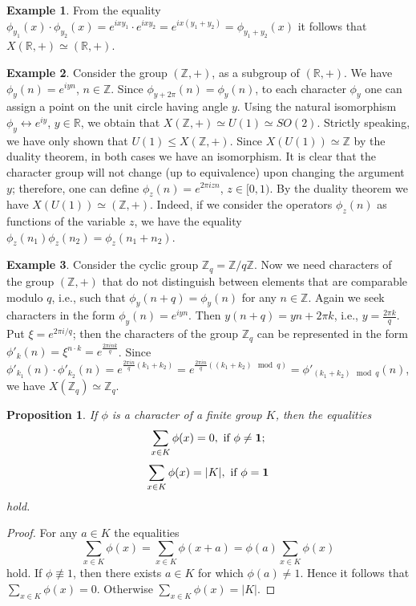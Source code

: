 \documentclass[11pt]{article}
\newtheorem{claim}{Proposition}[section]
\theoremstyle{definition}
\newtheorem{example}{Example}[section]
\begin{document}
{{{\begin{example}
From the equality $\phi_{y_1}(x)\cdot\phi_{y_2}(x)=e^{ixy_1}\cdot
e^{ixy_2}=e^{ix(y_1+y_2)}=\phi_{y_1+y_2}(x)$ it follows that
$X(\mathbb{R},+) \simeq (\mathbb{R},+)$.\end{example}

\begin{example}\label{ex:charZ}
 Consider the group $(\mathbb{Z},+)$, as a subgroup of
$(\mathbb{R},+)$. We have $\phi_y (n)=e^{iyn}$, $n\in \mathbb{Z}$.
Since $\phi_{y+2\pi} (n)=\phi_y (n)$, to each character $\phi_y$
one can assign a point on the unit circle
having angle $y$. Using the natural isomorphism
$\phi_y\leftrightarrow e^{iy}$, $y\in \mathbb{R}$,
we obtain that
$X({\mathbb{Z},+})\simeq U(1)\simeq SO(2)$. 
Strictly speaking, we have only shown that $U(1)\leq
X({\mathbb{Z},+})$. Since $X(U(1))\simeq  \mathbb{Z}$ by
 the duality theorem, in both cases we have an isomorphism.
It is clear that the
character group will not change (up to equivalence) upon changing
the argument $y$; therefore, one can define $\phi_z (n)=e^{2\pi izn}$,
$z\in [0,1)$. By the duality theorem we have
$X(U(1))\simeq(\mathbb{Z},+)$. Indeed, if we consider
the operators $\phi_z (n)$ as functions of the variable $z$, we have
the equality $\phi_z (n_1)\phi_z (n_2)=\phi_z(n_1+n_2)$.\end{example}

\begin{example}\label{ex:charZ_q}
 Consider the cyclic group
$\mathbb{Z}_q=\mathbb{Z}/q\mathbb{Z}$. Now we need
characters of the group $(\mathbb{Z},+)$ that do not distinguish between elements that are comparable
modulo $q$, i.e., such that $\phi_y (n+q)=\phi_y(n)$ for any
$n\in \mathbb{Z}$. Again we seek characters in the form $\phi_y (n)=e^{iyn}$.
Then $y(n+q)=yn+2\pi k$, i.e., $y=\frac{2\pi k}{q}$. Put
$\xi=e^{2\pi i/q}$; then the characters of the group $\mathbb{Z}_q$ can be
represented in the form $\phi'_k(n)=\xi^{n\cdot k}=e^{\frac{2\pi
ink}{q}}$. Since $\phi'_{k_1}(n)\cdot
\phi'_{k_2}(n)=e^{\frac{2\pi in}{q}(k_1+k_2) } =e^{\frac{2\pi
in}{q}((k_1+k_2)\mod q)}=\phi'_{(k_1+k_2)\mod q}(n)$, we have
$X({\mathbb{Z}}_q)\simeq \mathbb{Z}_q$.
\end{example}



\begin{claim}\label{c:char_sum}
        If $\phi$ is a character of a finite group $K$, then the
        equalities
        \[
        \sum\limits_{x\in K}\phi(x)=0,\mbox{ if }\phi\neq {\bf 1};
        \]
        \[
        \sum\limits_{x\in K}\phi(x)=|K|,\mbox{ if }\phi= {\bf 1}
        \]
        hold.
\end{claim}
\begin{proof}
   For any $a\in K$ the equalities
    \[
    \sum\limits_{x\in K}\phi(x)=\sum\limits_{x\in K}\phi(x+a)=\phi(a)\sum\limits_{x\in K}\phi(x)
    \]
    hold.
    If $\phi\not\equiv 1$, then there exists $a\in K$ for which $\phi(a)\neq 1$.
    Hence it follows that
     $\sum\limits_{x\in K}\phi(x)=0$. Otherwise $\sum\limits_{x\in
     K}\phi(x)=|K|$.
\end{proof}


}}}
\end{document}
